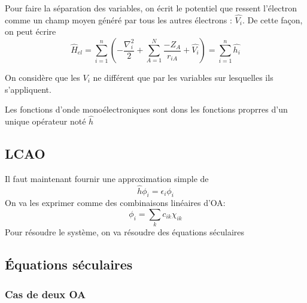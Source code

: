 \documentclass[french]{yLectureNote}
\newcommand{\HH}{\hat{H}}
\newcommand{\lap}{\nabla^2}
\begin{document}
Pour faire la séparation des variables, on écrit le potentiel que ressent l'électron comme un champ moyen généré par tous les autres électrons : \(\hat{V_i}\). De cette façon, on peut écrire
\[\HH_{el} = \sum_{i=1}^n(-\frac{\lap_i}{2}+\sum_{A=1}^N \frac{-Z_A}{r_{iA}}+\hat{V_i}) = \sum_{i=1}^n \hat{h_i}\]

On considère que les \(V_i\) ne différent que par les variables sur lesquelles ils s'appliquent.

Les fonctions d'onde monoélectroniques sont dons les fonctions proprres d'un unique opérateur noté \(\hat{h}\)
\subsection{LCAO}
Il faut maintenant fournir une approximation simple de \[\hat{h}\phi_i = \epsilon_i\phi_i\]
On va les exprimer comme des combinaisons linéaires d'OA:\[\phi_i = \sum_kc_{ik}\chi_{ik}\]
Pour résoudre le système, on va résoudre des équations séculaires
\subsection{Équations séculaires}
\subsubsection{Cas de deux OA}
\end{document}
